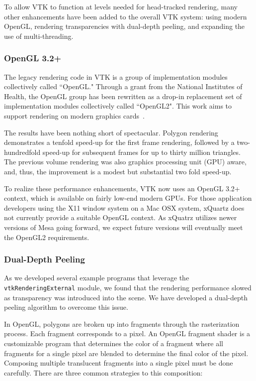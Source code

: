 To allow VTK to function at levels needed for head-tracked rendering,
many other enhancements have been added to the overall VTK system:
using modern OpenGL,
rendering transparencies with dual-depth peeling, and
expanding the use of multi-threading.

\subsubsection{OpenGL 3.2+}

The legacy rendering code in VTK is a group of implementation modules collectively called ``OpenGL."
Through a grant from the National Institutes of Health, the OpenGL group has
been rewritten as a drop-in replacement set of implementation modules
collectively called ``OpenGL2".
This work aims to support rendering on modern graphics cards~\cite{Hanwell:2015}.

The results have been nothing short of spectacular.
Polygon rendering demonstrates a tenfold speed-up for the first frame rendering, followed by a two-hundredfold speed-up for subsequent frames for up to thirty million triangles.
The previous volume rendering was also graphics processing unit (GPU) aware, and, thus, the improvement is a modest but substantial two fold speed-up. 

To realize these performance enhancements, VTK now uses an OpenGL 3.2+ context, which is available on fairly low-end modern GPUs.
For those application developers using the X11 window system on a Mac OSX system, xQuartz does not currently provide a suitable OpenGL context.
As xQuatrz utilizes newer versions of Mesa going forward, we expect future versions will eventually meet the OpenGL2 requirements.

\subsubsection{Dual-Depth Peeling}

As we developed several example programs that leverage the \texttt{vtkRenderingExternal} module, we found that the rendering performance slowed as transparency was introduced into the scene. We have developed a dual-depth peeling algorithm to overcome this issue.

In OpenGL, polygons are broken up into fragments through the rasterization process.
Each fragment corresponds to a pixel.
An OpenGL fragment shader is a customizable program that determines the color of a fragment where all fragments for a single pixel are blended to determine the final color of the pixel.
Composing multiple translucent fragments into a single pixel must be done carefully.
There are three common strategies to this composition:

